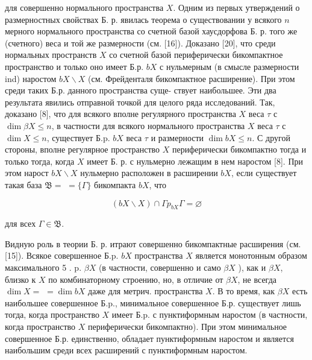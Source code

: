 \documentclass[10pt]{article}
\begin{document}
для совершенно нормального пространства $X$. Одним из первых утверждений о размерностных свойствах Б. р. явилась теорема о существовании у всякого $n$ мерного нормального пространства со счетной базой хаусдорфова Б. р. того же (счетного) веса и той же размерности (см. [16]). Доказано [20], что среди нормальных пространств $X$ со счетной базой периферически бикомпактное пространство и только оно имеет Б.р. $b X$ с нульмерным (в смысле размерности ind) наростом $b X \backslash X$ (см. Фрейденталя бикомпактное расширение). При этом среди таких Б.р. данного пространства суще- ствует наибольшее. Эти два результата явились отправной точкой для целого ряда исследований. Так, доказано [8], что для всякого вполне регулярного пространства $X$ веса $\tau$ с $\operatorname{dim} \beta X \leqslant n$, в частности для всякого нормального пространства $X$ веса $\tau$ с $\operatorname{dim} X \leqslant n$, существует Б.p. $b X$ веса $\tau$ и размерности $\operatorname{dim} b X \leqslant n$. С другой стороны, вполне регулярное пространство $X$ периферически бикомпактно тогда и только тогда, когда $X$ имеет Б. р. с нульмерно лежащим в нем наростом [8]. При этом нарост $b X \backslash X$ нульмерно расположен в расширении $b X$, если существует такая база $\mathfrak{B}=$ $=\{\Gamma\}$ бикомпакта $b X$, что



\[

(b X \backslash X) \cap \Gamma p_{b X} \Gamma=\varnothing

\]



для всех $\Gamma \in \mathfrak{B}$.



Видную роль в теории Б. р. итрают совершенно бикомпактные расширения (см. [15]). Всякое совершенное Б.p. $b X$ пространства $X$ является монотонным образом максимального 5 . p. $\beta X$ (в частности, совершенно и само $\beta X$ ), как и $\beta X$, близко к $X$ по комбинаторному строению, но, в отличие от $\beta X$, не всегда $\operatorname{dim} X=$ $=\operatorname{dim} b X$ даже для метрич. пространства $X$. В то время, как $\beta X$ есть наибольшее совершенное Б.p., минимальное совершенное Б.р. существует лишь тогда, когда пространство $X$ имеет Б.p. с пунктиформным наростом (в частности, когда пространство $X$ периферически бикомпактно). При этом минимальное совершенное Б.р. единственно, обладает пунктиформным наростом и является наибольшим среди всех расширений с пунктиформным наростом.
\end{document}
